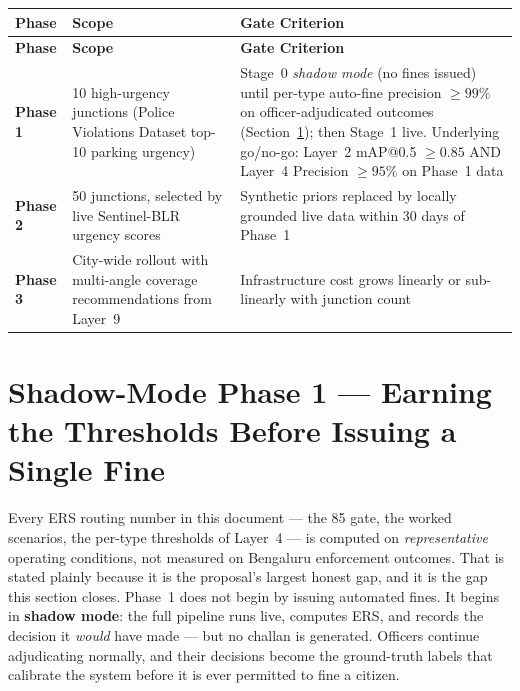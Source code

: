 \documentclass[11pt,a4paper]{article}
\begin{document}
\begin{longtable}{L{2cm} L{5.5cm} L{7cm}}
    \toprule
    \color{white}\textbf{Phase} & \color{white}\textbf{Scope} & \color{white}\textbf{Gate Criterion} \\
    \midrule
    \endfirsthead
    \toprule
    \color{white}\textbf{Phase} & \color{white}\textbf{Scope} & \color{white}\textbf{Gate Criterion} \\
    \midrule
    \endhead
    \bottomrule
    \endfoot

    \textbf{Phase 1} & 10 high-urgency junctions (Police Violations Dataset top-10 parking urgency) & Stage~0 \emph{shadow mode} (no fines issued) until per-type auto-fine precision $\geq 99\%$ on officer-adjudicated outcomes (Section~\ref{sec:shadow}); then Stage~1 live. Underlying go/no-go: Layer~2 mAP@0.5 $\geq 0.85$ AND Layer~4 Precision $\geq 95\%$ on Phase~1 data \\
    \textbf{Phase 2} & 50 junctions, selected by live Sentinel-BLR urgency scores & Synthetic priors replaced by locally grounded live data within 30 days of Phase~1 \\
    \textbf{Phase 3} & City-wide rollout with multi-angle coverage recommendations from Layer~9 & Infrastructure cost grows linearly or sub-linearly with junction count \\
\end{longtable}

\section{Shadow-Mode Phase 1 — Earning the Thresholds Before Issuing a Single Fine}
\label{sec:shadow}

Every ERS routing number in this document --- the 85 gate, the worked scenarios, the per-type thresholds of Layer~4 --- is computed on \emph{representative} operating conditions, not measured on Bengaluru enforcement outcomes. That is stated plainly because it is the proposal's largest honest gap, and it is the gap this section closes. Phase~1 does not begin by issuing automated fines. It begins in \textbf{shadow mode}: the full pipeline runs live, computes ERS, and records the decision it \emph{would} have made --- but no challan is generated. Officers continue adjudicating normally, and their decisions become the ground-truth labels that calibrate the system before it is ever permitted to fine a citizen.
\end{document}
